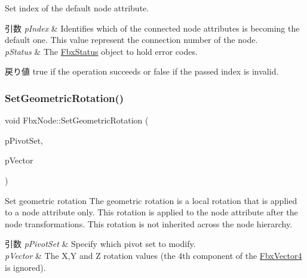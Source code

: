 Set index of the default node attribute. 
\begin{DoxyParams}{引数}
{\em p\+Index} & Identifies which of the connected node attributes is becoming the default one. This value represent the connection number of the node. \\
\hline
{\em p\+Status} & The \hyperlink{class_fbx_status}{Fbx\+Status} object to hold error codes. \\
\hline
\end{DoxyParams}
\begin{DoxyReturn}{戻り値}
{\ttfamily true} if the operation succeeds or {\ttfamily false} if the passed index is invalid. 
\end{DoxyReturn}
\mbox{\label{class_fbx_node_a4062b953d36a933a0022343b20f8b522}} 
\subsubsection{\texorpdfstring{Set\+Geometric\+Rotation()}{SetGeometricRotation()}}
{\footnotesize\ttfamily void Fbx\+Node\+::\+Set\+Geometric\+Rotation (\begin{DoxyParamCaption}\item[{\hyperlink{class_fbx_node_ae62b7311ac4727654cdf1ebd5cbf7343}{E\+Pivot\+Set}}]{p\+Pivot\+Set,  }\item[{\hyperlink{class_fbx_vector4}{Fbx\+Vector4}}]{p\+Vector }\end{DoxyParamCaption})}

Set geometric rotation The geometric rotation is a local rotation that is applied to a node attribute only. This rotation is applied to the node attribute after the node transformations. This rotation is not inherited across the node hierarchy. 
\begin{DoxyParams}{引数}
{\em p\+Pivot\+Set} & Specify which pivot set to modify. \\
\hline
{\em p\+Vector} & The X,Y and Z rotation values (the 4th component of the \hyperlink{class_fbx_vector4}{Fbx\+Vector4} is ignored). \\
\hline
\end{DoxyParams}
\mbox{\label{class_fbx_node_aa03076ed567455b364d4fd088fc00fd0}} 
